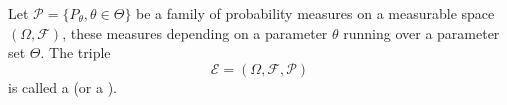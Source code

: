 Let $\mathcal{P} = \{P_{\theta}, \theta \in \Theta\}$ be a family of probability measures on a measurable space $(\Omega, \mathcal{F})$, these measures depending on a parameter $\theta$ running over a parameter set $\Theta$. The triple
$$\mathcal{E} = (\Omega, \mathcal{F}, \mathcal{P})$$
is called a  (or a ).

